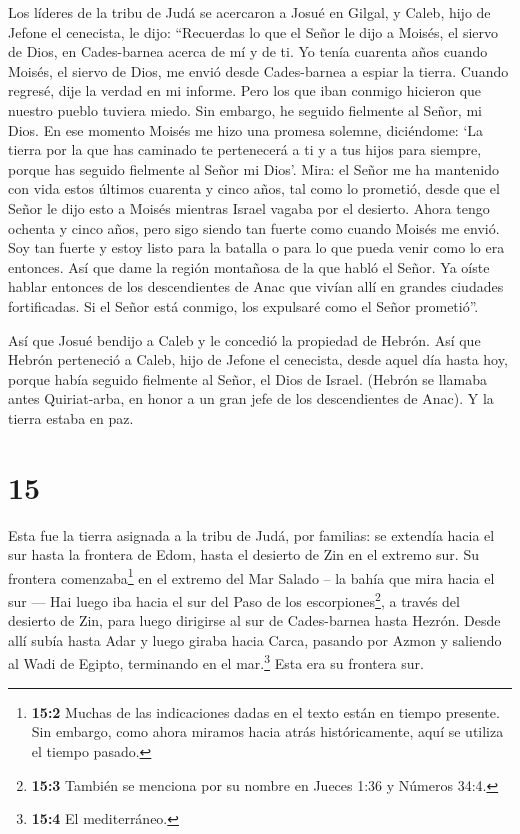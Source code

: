  Los líderes de la tribu de Judá se acercaron a Josué en
Gilgal, y Caleb, hijo de Jefone el cenecista, le dijo: ``Recuerdas lo
que el Señor le dijo a Moisés, el siervo de Dios, en Cades-barnea acerca
de mí y de ti.  Yo tenía cuarenta años cuando Moisés, el
siervo de Dios, me envió desde Cades-barnea a espiar la tierra. Cuando
regresé, dije la verdad en mi informe.  Pero los que iban
conmigo hicieron que nuestro pueblo tuviera miedo. Sin embargo, he
seguido fielmente al Señor, mi Dios.  En ese momento Moisés
me hizo una promesa solemne, diciéndome: `La tierra por la que has
caminado te pertenecerá a ti y a tus hijos para siempre, porque has
seguido fielmente al Señor mi Dios'.  Mira: el Señor me ha
mantenido con vida estos últimos cuarenta y cinco años, tal como lo
prometió, desde que el Señor le dijo esto a Moisés mientras Israel
vagaba por el desierto. Ahora tengo ochenta y cinco años, 
pero sigo siendo tan fuerte como cuando Moisés me envió. Soy tan fuerte
y estoy listo para la batalla o para lo que pueda venir como lo era
entonces.  Así que dame la región montañosa de la que habló
el Señor. Ya oíste hablar entonces de los descendientes de Anac que
vivían allí en grandes ciudades fortificadas. Si el Señor está conmigo,
los expulsaré como el Señor prometió''.

 Así que Josué bendijo a Caleb y le concedió la propiedad
de Hebrón.  Así que Hebrón perteneció a Caleb, hijo de
Jefone el cenecista, desde aquel día hasta hoy, porque había seguido
fielmente al Señor, el Dios de Israel.  (Hebrón se llamaba
antes Quiriat-arba, en honor a un gran jefe de los descendientes de
Anac). Y la tierra estaba en paz.

\hypertarget{section-14}{%
\section{15}\label{section-14}}

 Esta fue la tierra asignada a la tribu de Judá, por
familias: se extendía hacia el sur hasta la frontera de Edom, hasta el
desierto de Zin en el extremo sur.  Su frontera
comenzaba\footnote{\textbf{15:2} Muchas de las indicaciones dadas en el
  texto están en tiempo presente. Sin embargo, como ahora miramos hacia
  atrás históricamente, aquí se utiliza el tiempo pasado.} en el extremo
del Mar Salado -- la bahía que mira hacia el sur ---  Hai
luego iba hacia el sur del Paso de los escorpiones\footnote{\textbf{15:3}
  También se menciona por su nombre en Jueces 1:36 y Números 34:4.}, a
través del desierto de Zin, para luego dirigirse al sur de Cades-barnea
hasta Hezrón. Desde allí subía hasta Adar y luego giraba hacia Carca,
 pasando por Azmon y saliendo al Wadi de Egipto, terminando
en el mar.\footnote{\textbf{15:4} El mediterráneo.} Esta era su frontera
sur.


